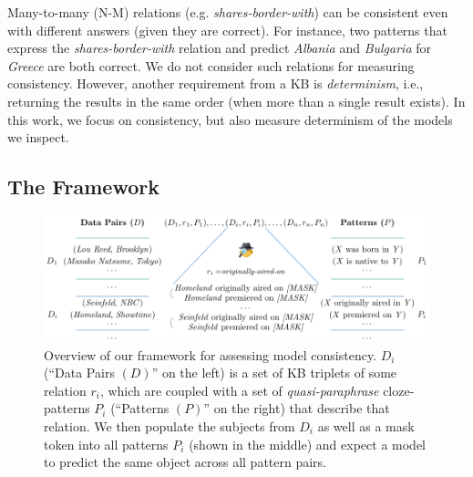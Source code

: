 Many-to-many (N-M) relations (e.g. \textit{shares-border-with}) can be consistent 
even with different answers (given they are correct). For
instance, two patterns that express the
\textit{shares-border-with} relation and predict
\textit{Albania} and \textit{Bulgaria} for
\textit{Greece}
are both correct. We do not consider such relations for measuring consistency. However, another requirement from a KB is \textit{determinism}, i.e., returning the results in the same order (when more than a single result exists).
In this work, we focus on consistency, but also measure determinism of the models we inspect.

\subsection{The Framework}
\label{sec:framework}

\begin{figure}[t!]
\centering

\includegraphics[width=1.\textwidth]{figures/framework}

\caption{Overview of our framework for assessing model
  consistency. $D_i$ (``Data Pairs $(D)$'' on the left) is a
  set of KB triplets of some relation $r_i$, which are
  coupled with a set of \textit{quasi-paraphrase}
  cloze-patterns $P_i$
(``Patterns $(P)$'' on the right)
  that describe that relation. We then populate the subjects
  from $D_i$ as well as a mask token into all patterns $P_i$
(shown in the middle)
  and expect a model to predict the same object across all pattern pairs.}
\label{fig:framework}
\end{figure}




